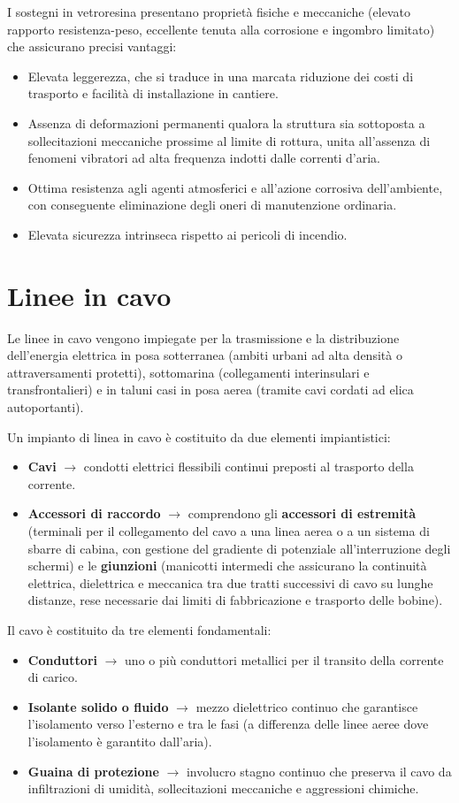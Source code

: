 I sostegni in vetroresina presentano proprietà fisiche e meccaniche (elevato rapporto resistenza-peso, eccellente tenuta alla corrosione e ingombro limitato) che assicurano precisi vantaggi:
\begin{itemize}
    \item Elevata leggerezza, che si traduce in una marcata riduzione dei costi di trasporto e facilità di installazione in cantiere.
    \item Assenza di deformazioni permanenti qualora la struttura sia sottoposta a sollecitazioni meccaniche prossime al limite di rottura, unita all'assenza di fenomeni vibratori ad alta frequenza indotti dalle correnti d'aria.
    \item Ottima resistenza agli agenti atmosferici e all'azione corrosiva dell'ambiente, con conseguente eliminazione degli oneri di manutenzione ordinaria.
    \item Elevata sicurezza intrinseca rispetto ai pericoli di incendio.
\end{itemize}

\section{Linee in cavo}
Le linee in cavo vengono impiegate per la trasmissione e la distribuzione dell'energia elettrica in posa sotterranea (ambiti urbani ad alta densità o attraversamenti protetti), sottomarina (collegamenti interinsulari e transfrontalieri) e in taluni casi in posa aerea (tramite cavi cordati ad elica autoportanti).

Un impianto di linea in cavo è costituito da due elementi impiantistici:
\begin{itemize}
    \item \textbf{Cavi} $\rightarrow$ condotti elettrici flessibili continui preposti al trasporto della corrente.
    \item \textbf{Accessori di raccordo} $\rightarrow$ comprendono gli \textbf{accessori di estremità} (terminali per il collegamento del cavo a una linea aerea o a un sistema di sbarre di cabina, con gestione del gradiente di potenziale all'interruzione degli schermi) e le \textbf{giunzioni} (manicotti intermedi che assicurano la continuità elettrica, dielettrica e meccanica tra due tratti successivi di cavo su lunghe distanze, rese necessarie dai limiti di fabbricazione e trasporto delle bobine).
\end{itemize}

Il cavo è costituito da tre elementi fondamentali:
\begin{itemize}
    \item \textbf{Conduttori} $\rightarrow$ uno o più conduttori metallici per il transito della corrente di carico.
    \item \textbf{Isolante solido o fluido} $\rightarrow$ mezzo dielettrico continuo che garantisce l'isolamento verso l'esterno e tra le fasi (a differenza delle linee aeree dove l'isolamento è garantito dall'aria).
    \item \textbf{Guaina di protezione} $\rightarrow$ involucro stagno continuo che preserva il cavo da infiltrazioni di umidità, sollecitazioni meccaniche e aggressioni chimiche.
\end{itemize}

